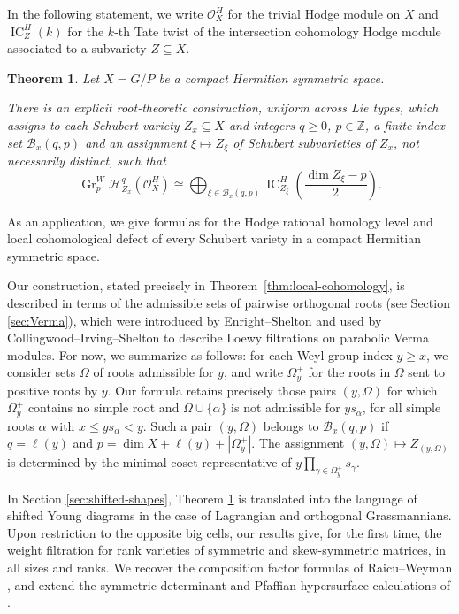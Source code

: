 \documentclass[12pt]{amsart}
\newtheorem{thmx}{Theorem}
\theoremstyle{definition}
\numberwithin{equation}{section}
\begin{document}
In the following statement, we write $\mathscr O_X^H$ for the trivial Hodge module on $X$ and $\operatorname{IC}_Z^H(k)$ for the $k$-th Tate twist of the intersection cohomology Hodge module associated to a subvariety $Z\subseteq X$.

\begin{thmx}\label{thm:intro-local-cohomology}
Let $X=G/P$ be a compact Hermitian symmetric space.

There is an explicit root-theoretic construction, uniform across
Lie types, which assigns to each Schubert variety
$Z_x\subseteq X$ and integers $q\geq0$, $p\in\mathbb Z$,
a finite index set $\mathscr B_x(q,p)$ and an assignment
$\xi\mapsto Z_\xi$ of Schubert subvarieties of $Z_x$,
not necessarily distinct, such that
\[
\operatorname{Gr}^W_p
\mathscr H^q_{Z_x}(\mathscr O_X^H)
\cong
\bigoplus_{\xi\in\mathscr B_x(q,p)}
\operatorname{IC}_{Z_\xi}^H
\left(\frac{\dim Z_\xi-p}{2}\right).
\]
\end{thmx}

\noindent As an application, we give formulas for the Hodge rational homology level \cites{ParkPopa,DORhrh} and local cohomological defect of every Schubert variety in a compact Hermitian symmetric space. 

 Our construction, stated precisely in Theorem~\ref{thm:local-cohomology}, is described in terms of the admissible sets of pairwise orthogonal roots (see Section \ref{sec:Verma}), which were introduced by Enright--Shelton \cite{EnrightShelton} and used by Collingwood--Irving--Shelton
\cite{cisWeight} to describe Loewy filtrations on parabolic Verma modules. For now, we summarize as follows: for each Weyl group index $y\geq x$, we consider sets $\Omega$ of roots admissible for $y$, and write $\Omega_y^+$ for the
roots in $\Omega$ sent to positive roots by $y$.
Our formula retains precisely those pairs $(y,\Omega)$ for which
$\Omega_y^+$ contains no simple root and
$\Omega\cup\{\alpha\}$ is not admissible for $ys_\alpha$, for all simple roots $\alpha$ with $x\leq ys_\alpha<y$. Such a pair $(y,\Omega)$ belongs to $\mathscr B_x(q,p)$ if $q=\ell(y)$ and $p=\dim X+\ell(y)+|\Omega_y^+|$. The assignment $(y,\Omega)\mapsto Z_{(y,\Omega)}$ is determined by the minimal coset representative of
$y\prod_{\gamma\in\Omega_y^+}s_\gamma$. 

In Section \ref{sec:shifted-shapes}, Theorem \ref{thm:intro-local-cohomology} is translated into the language of shifted Young diagrams in the case of Lagrangian
and orthogonal Grassmannians. Upon restriction to the opposite big cells, our results give, for the first time, the weight filtration for rank varieties of symmetric and skew-symmetric matrices, in all sizes and ranks. We recover
the composition factor formulas of Raicu--Weyman
\cite{rw,raicu2016local}, and extend the symmetric determinant and
Pfaffian hypersurface calculations of \cite{LYsemi}. 
\end{document}
